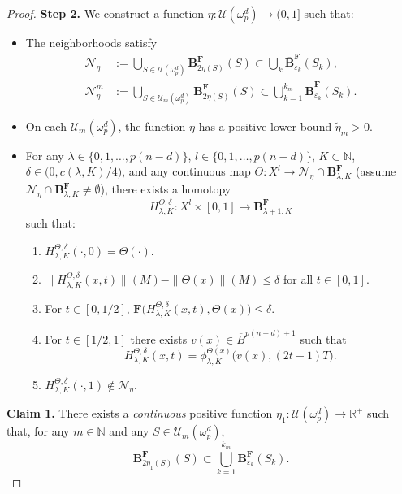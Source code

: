 \documentclass[12pt,english]{article}
\theoremstyle{definition}
\begin{document}
\begin{proof}
\textbf{Step 2.} We construct a function \(\eta:\mathcal{U}(\omega^d_p)\to(0,1]\) such that:
\begin{itemize}
    \item The neighborhoods satisfy
    \[
    \begin{aligned}
    \mathcal N_\eta &:= \bigcup_{S\in\mathcal U(\omega^d_p)} \mathbf B^\mathbf{F}_{2\eta(S)}(S)
    \subset \bigcup_{k} \overline{\mathbf B}^\mathbf{F}_{\varepsilon_k}(S_k),\\
    \mathcal N^m_\eta &:= \bigcup_{S\in\mathcal U_m(\omega^d_p)} \mathbf B^\mathbf{F}_{2\eta(S)}(S)
    \subset \bigcup_{k=1}^{k_m} \overline{ \mathbf B}^\mathbf{F}_{\varepsilon_k}(S_k).
    \end{aligned}
    \]
    \item On each \(\mathcal{U}_m(\omega^d_p)\), the function \(\eta\) has a positive lower bound \(\tilde\eta_m>0\).
    \item For any \(\lambda\in\{0,1,\dots,p(n-d)\}\), \(l\in\{0,1,\dots,p(n-d)\}\), \(K\subset\mathbb{N}\), \(\delta\in\bigl(0,c(\lambda,K)/4\bigr)\), and any continuous map \(\Theta:X^l\to \mathcal{N}_\eta\cap \mathbf{B}^\mathbf{F}_{\lambda,K}\) (assume \(\mathcal{N}_\eta\cap \mathbf{B}^\mathbf{F}_{\lambda,K}\neq\emptyset\)), there exists a homotopy
    \[
        H^{\Theta,\delta}_{\lambda,K}:X^l\times[0,1]\to \mathbf{B}^\mathbf{F}_{\lambda+1,K}
    \]
    such that:
    \begin{enumerate}
        \item \(H^{\Theta,\delta}_{\lambda,K}(\cdot,0)=\Theta(\cdot)\).
        \item \(\|H^{\Theta,\delta}_{\lambda,K}(x,t)\|(M)-\|\Theta(x)\|(M)\le \delta\) for all \(t\in[0,1]\).
        \item For \(t\in[0,1/2]\), \(\mathbf{F}\bigl(H^{\Theta,\delta}_{\lambda,K}(x,t),\Theta(x)\bigr)\le \delta\).
        \item For \(t\in[1/2,1]\) there exists \(v(x)\in\overline{B}^{p(n-d)+1}\) such that
        \begin{equation}\label{eq:flow}
            H^{\Theta,\delta}_{\lambda,K}(x,t)=\phi^{\Theta(x)}_{\lambda,K}\bigl(v(x),(2t-1)T\bigr).
        \end{equation}
        \item \(H^{\Theta,\delta}_{\lambda,K}(\cdot,1)\notin \mathcal{N}_\eta\).
    \end{enumerate}
\end{itemize}
        
\textbf{Claim 1.} There exists a \emph{continuous} positive function \(\eta_1:\mathcal{U}(\omega^d_p)\to\mathbb{R}^+\) such that, for any \(m\in\mathbb{N}\) and any \(S\in\mathcal{U}_m(\omega^d_p)\),
\[
    \mathbf{B}^\mathbf{F}_{2\eta_1(S)}(S)\subset \bigcup_{k=1}^{k_m}\mathbf{B}^\mathbf{F}_{\varepsilon_k}(S_k).
\]


\end{proof}
\end{document}
